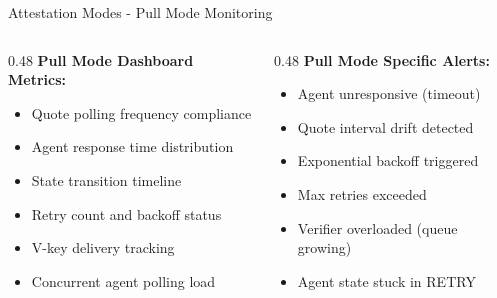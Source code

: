 \begin{frame}{Attestation Modes - Pull Mode Monitoring}
  \scriptsize
  \begin{columns}[T]
    \begin{column}{0.48\textwidth}
      \textbf{Pull Mode Dashboard Metrics:}
      \begin{itemize}
        \item Quote polling frequency compliance
        \item Agent response time distribution
        \item State transition timeline
        \item Retry count and backoff status
        \item V-key delivery tracking
        \item Concurrent agent polling load
      \end{itemize}
    \end{column}
    \begin{column}{0.48\textwidth}
      \textbf{Pull Mode Specific Alerts:}
      \begin{itemize}
        \item Agent unresponsive (timeout)
        \item Quote interval drift detected
        \item Exponential backoff triggered
        \item Max retries exceeded
        \item Verifier overloaded (queue growing)
        \item Agent state stuck in RETRY
      \end{itemize}
    \end{column}
  \end{columns}
\end{frame}

